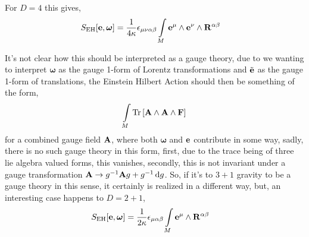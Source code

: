 For $D=4$ this gives,
\begin{align*}
    S_{\textnormal{EH}}\qty[\vb e,\boldsymbol\omega]&=\frac{1}{4\kappa}\epsilon_{\mu\nu\alpha\beta}\int\limits_M\vb e^{\mu}\wedge\vb e^\nu\wedge\vb R^{\alpha\beta}
\end{align*}

It's not clear how this should be interpreted as a gauge theory, due to we wanting to interpret $\boldsymbol\omega$ as the gauge 1-form of Lorentz transformations and $\tilde{\vb e}$ as the gauge 1-form of 
translations, the Einstein Hilbert Action should then be something of the form,
\begin{align*}
    \int\limits_M\Tr\qty[\vb A\wedge\vb A\wedge\vb F]
\end{align*}
for a combined gauge field $\vb A$, where both $\boldsymbol\omega$ and $\vb e$ contribute in some way, sadly, there is no such gauge theory in this form, 
first, due to the trace being of three lie algebra valued forms, this vanishes, secondly, this is not invariant under a gauge transformation $\vb A\rightarrow g^{-1}\vb Ag+g^{-1}\dd{g}$. So, 
if it's to $3+1$ gravity to be a gauge theory in this sense, it certainly is realized in a different way, but, an interesting case happens to $D=2+1$,
\begin{align*}
    S_{\textnormal{EH}}\qty[\vb e,\boldsymbol\omega]&=\frac{1}{2\kappa}\epsilon_{\mu\alpha\beta}\int\limits_M\vb e^{\mu}\wedge\vb R^{\alpha\beta}
\end{align*}

